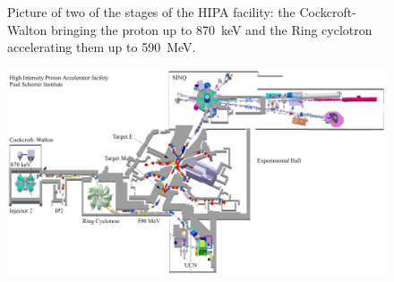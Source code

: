 \begin{refsection}
\begin{figure}
            \caption{Picture of two of the stages of the HIPA facility: the Cockcroft-Walton bringing the proton up to \SI{870}{keV} and the Ring cyclotron accelerating them up to \SI{590}{MeV}.}
        \end{figure}
        \begin{figure}
            \centering
            \includegraphics[width = \textwidth]{Figures/Introduction/PSI_HIPA.png}

\end{figure}
\end{refsection}
